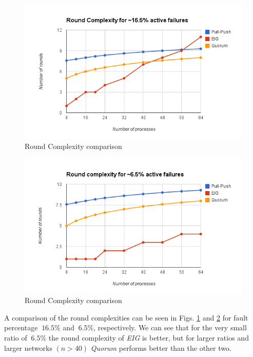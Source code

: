 \begin{figure}[ht]
 \centering
\vspace{-3mm}
\includegraphics[scale=0.4]{Round16}
\vspace{-1mm}
\caption{Round Complexity comparison}
 \label{fig:round16}
\vspace{-4mm}
\end{figure}

\begin{figure}[ht]
 \centering
\vspace{-4mm}
\includegraphics[scale=0.4]{Round6}
\vspace{-1mm}
\caption{Round Complexity comparison}
 \label{fig:round6}
\vspace{-4mm}
\end{figure}

A comparison of the round complexities can be seen in Figs. \ref{fig:round16} and \ref{fig:round6} for fault percentage $~16.5\%$ and $~6.5\%$, respectively. We can see that for the very small ratio of $~6.5\%$ the round complexity of \textit{EIG} is better, but for larger ratios and larger networks $(n > 40)$ \textit{Quorum} performs better than the other two. 


